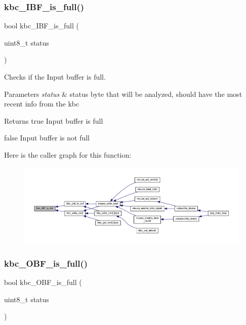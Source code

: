 \subsubsection{\texorpdfstring{kbc\+\_\+\+I\+B\+F\+\_\+is\+\_\+full()}{kbc\_IBF\_is\_full()}}
{\footnotesize\ttfamily bool kbc\+\_\+\+I\+B\+F\+\_\+is\+\_\+full (\begin{DoxyParamCaption}\item[{uint8\+\_\+t}]{status }\end{DoxyParamCaption})}



Checks if the Input buffer is full. 


\begin{DoxyParams}{Parameters}
{\em status} & status byte that will be analyzed, should have the most recent info from the kbc \\
\hline
\end{DoxyParams}
\begin{DoxyReturn}{Returns}
true Input buffer is full 

false Input buffer is not full 
\end{DoxyReturn}
Here is the caller graph for this function\+:\nopagebreak
\begin{figure}[H]
\begin{center}
\leavevmode
\includegraphics[width=350pt]{group__keyboard_ga710a06495d4ad2c8afba84634ec89984_icgraph}
\end{center}
\end{figure}
\mbox{\label{group__keyboard_ga4e0b2a8300752760d8c7f10fcb55b67a}} 
\subsubsection{\texorpdfstring{kbc\+\_\+\+O\+B\+F\+\_\+is\+\_\+full()}{kbc\_OBF\_is\_full()}}
{\footnotesize\ttfamily bool kbc\+\_\+\+O\+B\+F\+\_\+is\+\_\+full (\begin{DoxyParamCaption}\item[{uint8\+\_\+t}]{status }\end{DoxyParamCaption})}



